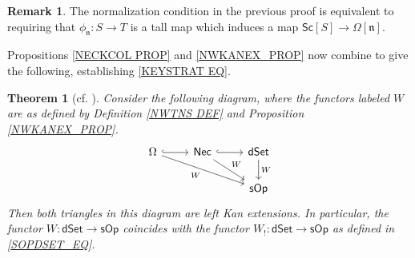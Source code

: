 \documentclass[a4paper,10pt]{article}%
\numberwithin{equation}{section}
\numberwithin{figure}{section}
\newtheorem{theorem}[equation]{Theorem}%
\theoremstyle{definition} %
\newtheorem{remark}[equation]{Remark}%
\begin{document}
\begin{remark}
	The normalization condition in the previous proof
	is equivalent to requiring that 
	$\phi_{\mathfrak{n}} \colon S \to T$
	is a tall map which induces a map
	$\mathsf{Sc}[S] \to \Omega[\mathfrak{n}]$.
\end{remark}



Propositions \ref{NECKCOL PROP} and 
\ref{NWKANEX_PROP}
now combine to give the following, establishing \eqref{KEYSTRAT EQ}.


\begin{theorem}[{cf. \cite[Thm. 1.3]{DS11}}]
	\label{KANEXTCHAR THM}
	Consider the following diagram,
	where the functors labeled $W$ 
	are as defined by Definition \ref{NWTNS DEF}
	and Proposition \ref{NWKANEX_PROP}.
\begin{equation}
\begin{tikzcd}
	\Omega \ar[hookrightarrow]{r}
	\ar{rrd}[swap]{W} 
&
	\mathsf{Nec}
	\ar[hookrightarrow]{r}
	\ar{rd}{W}
&
	\mathsf{dSet}
	\ar{d}{W}
\\
&&
	\mathsf{sOp} 
\end{tikzcd}
\end{equation}
Then both triangles in this diagram are left Kan extensions.
%
In particular, the functor
$W \colon \mathsf{dSet} \to \mathsf{sOp}$
coincides with the functor
$W_! \colon \mathsf{dSet} \to \mathsf{sOp}$
as defined in \eqref{SOPDSET_EQ}.
\end{theorem}
\end{document}
